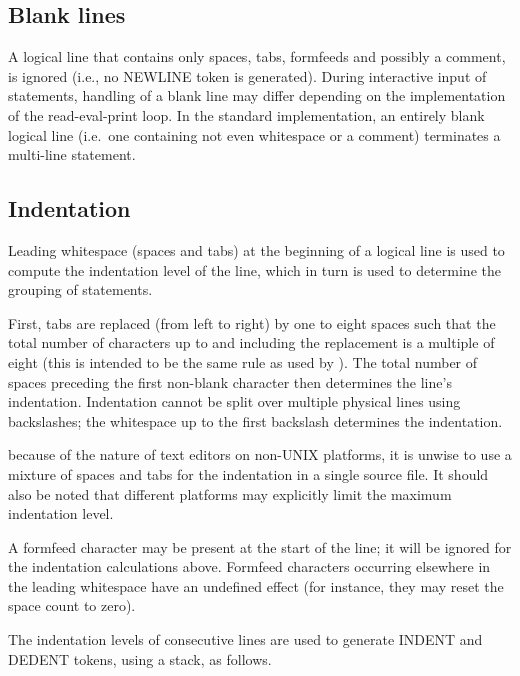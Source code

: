 \subsection{Blank lines \label{blank-lines}}

A logical line that contains only spaces, tabs, formfeeds and possibly
a comment, is ignored (i.e., no NEWLINE token is generated).  During
interactive input of statements, handling of a blank line may differ
depending on the implementation of the read-eval-print loop.  In the
standard implementation, an entirely blank logical line (i.e.\ one
containing not even whitespace or a comment) terminates a multi-line
statement.


\subsection{Indentation\label{indentation}}

Leading whitespace (spaces and tabs) at the beginning of a logical
line is used to compute the indentation level of the line, which in
turn is used to determine the grouping of statements.

First, tabs are replaced (from left to right) by one to eight spaces
such that the total number of characters up to and including the
replacement is a multiple of
eight (this is intended to be the same rule as used by \UNIX).  The
total number of spaces preceding the first non-blank character then
determines the line's indentation.  Indentation cannot be split over
multiple physical lines using backslashes; the whitespace up to the
first backslash determines the indentation.

 because of the nature of
text editors on non-UNIX platforms, it is unwise to use a mixture of
spaces and tabs for the indentation in a single source file.  It
should also be noted that different platforms may explicitly limit the
maximum indentation level.

A formfeed character may be present at the start of the line; it will
be ignored for the indentation calculations above.  Formfeed
characters occurring elsewhere in the leading whitespace have an
undefined effect (for instance, they may reset the space count to
zero).

The indentation levels of consecutive lines are used to generate
INDENT and DEDENT tokens, using a stack, as follows.

